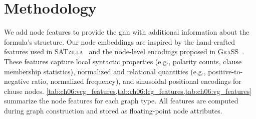 \section{Methodology}

We add node features to provide the \gls{gnn} with additional information about the formula's structure. Our node embeddings are inspired by the hand-crafted features used in \textsc{SATzilla}~\citep{NudEtAl04b} and the node-level encodings proposed in \textsc{GraSS}~\citep{ZhaEtAl24b}. These features capture local syntactic properties (e.g., polarity counts, clause membership statistics), normalized and relational quantities (e.g., positive-to-negative ratio, normalized frequency), and sinusoidal positional encodings for clause nodes. \cref{tab:ch06:vcg_features,tab:ch06:lcg_features,tab:ch06:vg_features} summarize the node features for each graph type. All features are computed during graph construction and stored as floating-point node attributes.

